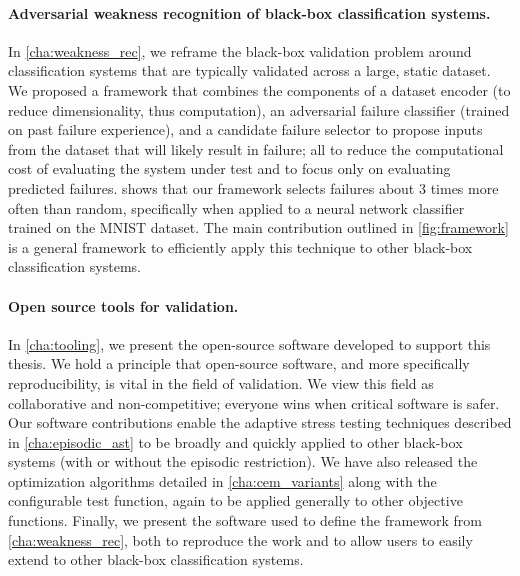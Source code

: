 \paragraph{Adversarial weakness recognition of black-box classification systems.}
In \cref{cha:weakness_rec}, we reframe the black-box validation problem around classification systems that are typically validated across a large, static dataset.
We proposed a framework that combines the components of a dataset encoder (to reduce dimensionality, thus computation), an adversarial failure classifier (trained on past failure experience), and a candidate failure selector to propose inputs from the dataset that will likely result in failure; all to reduce the computational cost of evaluating the system under test and to focus only on evaluating predicted failures.
 shows that our framework selects failures about 3 times more often than random, specifically when applied to a neural network classifier trained on the MNIST dataset.
The main contribution outlined in \cref{fig:framework} is a general framework to efficiently apply this technique to other black-box classification systems.

\paragraph{Open source tools for validation.}
In \cref{cha:tooling}, we present the open-source software developed to support this thesis.
We hold a principle that open-source software, and more specifically reproducibility, is vital in the field of validation.
We view this field as collaborative and non-competitive; everyone wins when critical software is safer.
Our software contributions enable the adaptive stress testing techniques described in \cref{cha:episodic_ast} to be broadly and quickly applied to other black-box systems (with or without the episodic restriction).
We have also released the optimization algorithms detailed in \cref{cha:cem_variants} along with the configurable test function, again to be applied generally to other objective functions.
Finally, we present the software used to define the framework from \cref{cha:weakness_rec}, both to reproduce the work and to allow users to easily extend to other black-box classification systems.


